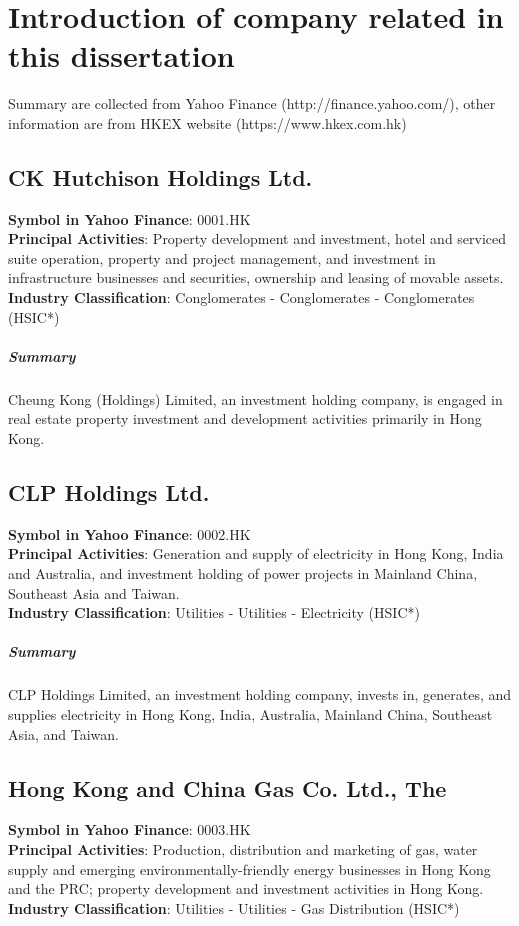\chapter{Introduction of company related in this dissertation}
\label{ch:stock_info}

Summary are collected from Yahoo Finance (http://finance.yahoo.com/), other information are from HKEX website (https://www.hkex.com.hk)


\section{CK Hutchison Holdings Ltd.}
\textbf{Symbol in Yahoo Finance}: 0001.HK\\
\textbf{Principal Activities}: Property development and investment, hotel and serviced suite operation, property and project management, and investment in infrastructure businesses and securities, ownership and leasing of movable assets.\\
\textbf{Industry Classification}: Conglomerates - Conglomerates - Conglomerates (HSIC*)
\paragraph{Summary}
Cheung Kong (Holdings) Limited, an investment holding company, is engaged in real estate property investment and development activities primarily in Hong Kong.


\section{CLP Holdings Ltd.}
\textbf{Symbol in Yahoo Finance}: 0002.HK\\
\textbf{Principal Activities}: Generation and supply of electricity in Hong Kong, India and Australia, and investment holding of power projects in Mainland China, Southeast Asia and Taiwan.\\
\textbf{Industry Classification}: Utilities - Utilities - Electricity (HSIC*)
\paragraph{Summary}
CLP Holdings Limited, an investment holding company, invests in, generates, and supplies electricity in Hong Kong, India, Australia, Mainland China, Southeast Asia, and Taiwan.


\section{Hong Kong and China Gas Co. Ltd., The}
\textbf{Symbol in Yahoo Finance}: 0003.HK\\
\textbf{Principal Activities}: Production, distribution and marketing of gas, water supply and emerging environmentally-friendly energy businesses in Hong Kong and the PRC; property development and investment activities in Hong Kong.\\
\textbf{Industry Classification}: Utilities - Utilities - Gas Distribution (HSIC*)
